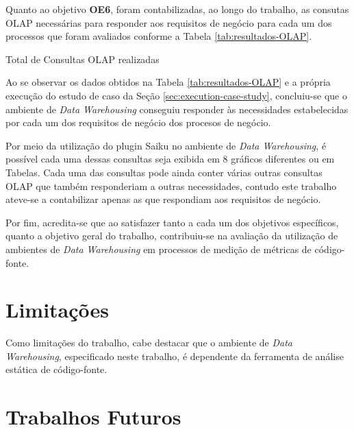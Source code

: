 Quanto ao objetivo \textbf{OE6}, foram contabilizadas, ao longo do trabalho, as consutas OLAP necessárias para responder aos requisitos de negócio para cada um dos processos que foram avaliados conforme a Tabela \ref{tab:resultados-OLAP}.

 
\begin{table}[H]
\begin{center}

\caption{Total de Consultas OLAP realizadas}
\label{tab:resultados-OLAP}
\end{center}
\end{table}
\FloatBarrier


Ao se observar os dados obtidos na Tabela \ref{tab:resultados-OLAP} e a própria execução do estudo de caso da Seção \ref{sec:execution-case-study}, concluiu-se que o ambiente de \textit{Data Warehousing} conseguiu responder às necessidades estabelecidas por cada um dos requisitos de negócio dos procesos de negócio. 

Por meio da utilização do plugin Saiku no ambiente de \textit{Data Warehousing}, é possível cada uma dessas consultas seja exibida em 8 gráficos diferentes ou em Tabelas. Cada uma das consultas pode ainda conter várias outras consultas OLAP que também responderiam a outras necessidades, contudo este trabalho ateve-se a contabilizar apenas as que respondiam aos requisitos de negócio.

Por fim, acredita-se que ao satisfazer tanto a cada um dos objetivos específicos, quanto a objetivo geral do trabalho, contribuiu-se na avaliação da utilização de ambientes de \textit{Data Warehousing} em processos de medição de métricas de código-fonte. 

\section{Limitações}

Como limitações do trabalho, cabe destacar que o ambiente de \textit{Data Warehousing}, especificado neste trabalho, é dependente da ferramenta de análise estática de código-fonte.


\section{Trabalhos Futuros}




